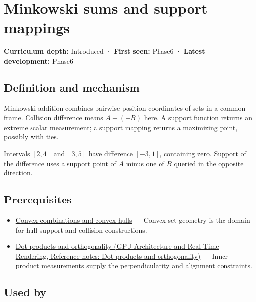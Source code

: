 \hypertarget{appendix-215ac7099a82}{}\label{referencestart:appendix-215ac7099a82}
\section{Minkowski sums and support mappings}\label{appendix-215ac7099a82-minkowski-sums-and-support-mappings}

\textbf{Curriculum depth:} Introduced · \textbf{First seen:} Phase6 · \textbf{Latest development:} Phase6

\begin{allmightroledefinition}

\subsection{Definition and mechanism}\label{appendix-215ac7099a82-definition-and-mechanism}

Minkowski addition combines pairwise position coordinates of sets in a common frame. Collision difference means \(A+(-B)\) here. A support function returns an extreme scalar measurement; a support mapping returns a maximizing point, possibly with ties.

\end{allmightroledefinition}

Intervals \([2,4]\) and \([3,5]\) have difference \([-3,1]\), containing zero. Support of the difference uses a support point of \(A\) minus one of \(B\) queried in the opposite direction.

\subsection{Prerequisites}\label{appendix-215ac7099a82-prerequisites}

\begin{itemize}
\tightlist
\item
  \hyperref[appendix-0026ec42c9d5]{Convex combinations and convex hulls} --- Convex set geometry is the domain for hull support and collision constructions.
\item
  \href{../06-GPU-Architecture-and-Real-Time-Rendering/main.pdf\#nameddest=appendix-8bc4e8fc547c}{Dot products and orthogonality (GPU Architecture and Real-Time Rendering, Reference notes: Dot products and orthogonality)} --- Inner-product measurements supply the perpendicularity and alignment constraints.
\end{itemize}

\subsection{Used by}\label{appendix-215ac7099a82-used-by}

